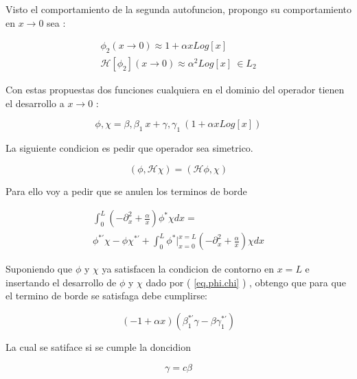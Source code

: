 Visto el comportamiento de la segunda autofuncion, propongo su comportamiento en $x \rightarrow 0 $ sea :

\begin{equation}
\begin{array}{c}
\phi _2 (x \rightarrow 0) \approx 1 + \alpha x Log[x] \\
\mathscr{H} [\phi _2] (x \rightarrow 0 ) \approx \alpha ^2 Log[x] \ \in L _2
\end{array}
\label{eq.chico2}
\end{equation}

Con estas propuestas dos funciones cualquiera en el dominio del operador tienen el desarrollo a $x \rightarrow 0$ :

\begin{equation}
\phi , \chi = \beta , \beta _1 \ x + \gamma , \gamma _1 \ (1+ \alpha x Log[x] )
\label{eq.phi.chi}
\end{equation}

La siguiente condicion es pedir que operador sea simetrico.

\begin{equation}
(\phi, \mathscr{H} \chi ) = ( \mathscr{H} \phi , \chi )
\end{equation}

Para ello voy a pedir que se anulen los terminos de borde

\begin{equation}
\begin{array}{c}
\int _0 ^{L} 
\left(
- \partial ^2 _x + \frac{\alpha}{x}
\right)
\phi ^{*} \chi dx = \\
\phi ^{*'} \chi - \phi \chi ^{* '} + 
\int _0 ^{L} 
\phi ^{*} 
| _{x=0} ^{x=L}
\left(
- \partial _x ^2 + \frac{\alpha}{x}
\right)
\chi dx 
\end{array}
\end{equation}

Suponiendo que $\phi $ y $ \chi $ ya satisfacen la condicion de contorno en $x=L$ e insertando el desarrollo de $\phi$ y $\chi$ dado por ( \ref{eq.phi.chi} ) , obtengo que para que el termino de borde se satisfaga debe cumplirse:

\begin{equation}
\left(
-1 + \alpha x 
\right)
\left(
\beta _1 ^{* '} \gamma - \beta \gamma _1 ^{* '}
\right)
\end{equation}

La cual se satiface si se cumple la doncidion 

\begin{equation}
\gamma = c \beta 
\end{equation}

